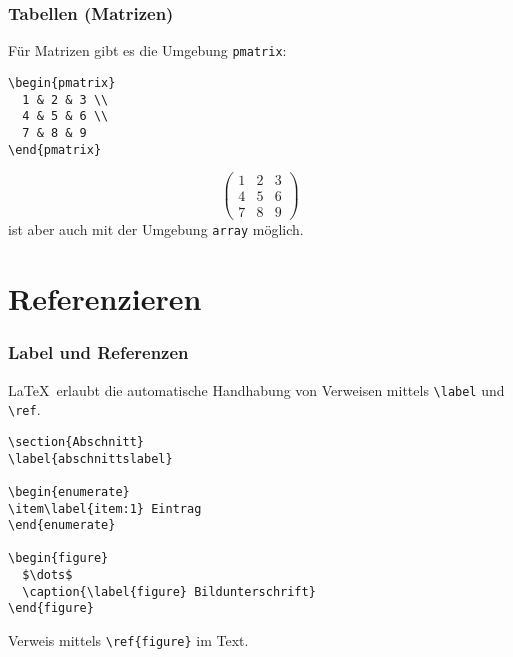 \begin{frame}[fragile]
  \frametitle{Tabellen (Matrizen)}

  \onslide<+->

  Für Matrizen gibt es die Umgebung \texttt{pmatrix}:

\begin{lstlisting}
\begin{pmatrix}
  1 & 2 & 3 \\
  4 & 5 & 6 \\
  7 & 8 & 9
\end{pmatrix}
\end{lstlisting}
  \begin{equation*}
    \begin{pmatrix}
      1 & 2 & 3 \\
      4 & 5 & 6 \\
      7 & 8 & 9
    \end{pmatrix}
  \end{equation*}
  ist aber auch mit der Umgebung \texttt{array} möglich.

\end{frame}


\section{Referenzieren}

\begin{frame}[fragile]
  \frametitle{Label und Referenzen}

  \onslide<+->

  \LaTeX\ erlaubt die automatische Handhabung von Verweisen mittels \lstinline{\label} und
  \lstinline{\ref}.

  \onslide<+->

\begin{lstlisting}
\section{Abschnitt}
\label{abschnittslabel}

\begin{enumerate}
\item\label{item:1} Eintrag
\end{enumerate}

\begin{figure}
  $\dots$
  \caption{\label{figure} Bildunterschrift}
\end{figure}
\end{lstlisting}

  \onslide<+->

  Verweis mittels \lstinline!\ref{figure}! im Text.

\end{frame}

